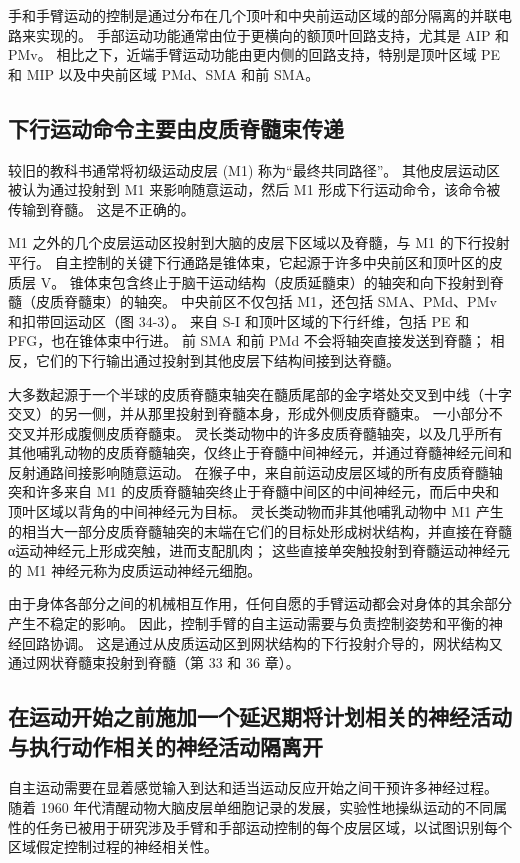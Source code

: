 手和手臂运动的控制是通过分布在几个顶叶和中央前运动区域的部分隔离的并联电路来实现的。 手部运动功能通常由位于更横向的额顶叶回路支持，尤其是 AIP 和 PMv。 相比之下，近端手臂运动功能由更内侧的回路支持，特别是顶叶区域 PE 和 MIP 以及中央前区域 PMd、SMA 和前 SMA。




\subsection{下行运动命令主要由皮质脊髓束传递}
较旧的教科书通常将初级运动皮层 (M1) 称为“最终共同路径”。 其他皮层运动区被认为通过投射到 M1 来影响随意运动，然后 M1 形成下行运动命令，该命令被传输到脊髓。 这是不正确的。

M1 之外的几个皮层运动区投射到大脑的皮层下区域以及脊髓，与 M1 的下行投射平行。 自主控制的关键下行通路是锥体束，它起源于许多中央前区和顶叶区的皮质层 V。 锥体束包含终止于脑干运动结构（皮质延髓束）的轴突和向下投射到脊髓（皮质脊髓束）的轴突。 中央前区不仅包括 M1，还包括 SMA、PMd、PMv 和扣带回运动区（图 34-3）。 来自 S-I 和顶叶区域的下行纤维，包括 PE 和 PFG，也在锥体束中行进。 前 SMA 和前 PMd 不会将轴突直接发送到脊髓； 相反，它们的下行输出通过投射到其他皮层下结构间接到达脊髓。

大多数起源于一个半球的皮质脊髓束轴突在髓质尾部的金字塔处交叉到中线（十字交叉）的另一侧，并从那里投射到脊髓本身，形成外侧皮质脊髓束。 一小部分不交叉并形成腹侧皮质脊髓束。 灵长类动物中的许多皮质脊髓轴突，以及几乎所有其他哺乳动物的皮质脊髓轴突，仅终止于脊髓中间神经元，并通过脊髓神经元间和反射通路间接影响随意运动。 在猴子中，来自前运动皮层区域的所有皮质脊髓轴突和许多来自 M1 的皮质脊髓轴突终止于脊髓中间区的中间神经元，而后中央和顶叶区域以背角的中间神经元为目标。 灵长类动物而非其他哺乳动物中 M1 产生的相当大一部分皮质脊髓轴突的末端在它们的目标处形成树状结构，并直接在脊髓α运动神经元上形成突触，进而支配肌肉； 这些直接单突触投射到脊髓运动神经元的 M1 神经元称为皮质运动神经元细胞。

由于身体各部分之间的机械相互作用，任何自愿的手臂运动都会对身体的其余部分产生不稳定的影响。 因此，控制手臂的自主运动需要与负责控制姿势和平衡的神经回路协调。 这是通过从皮质运动区到网状结构的下行投射介导的，网状结构又通过网状脊髓束投射到脊髓（第 33 和 36 章）。

\subsection{在运动开始之前施加一个延迟期将计划相关的神经活动与执行动作相关的神经活动隔离开}
自主运动需要在显着感觉输入到达和适当运动反应开始之间干预许多神经过程。 随着 1960 年代清醒动物大脑皮层单细胞记录的发展，实验性地操纵运动的不同属性的任务已被用于研究涉及手臂和手部运动控制的每个皮层区域，以试图识别每个区域假定控制过程的神经相关性。

